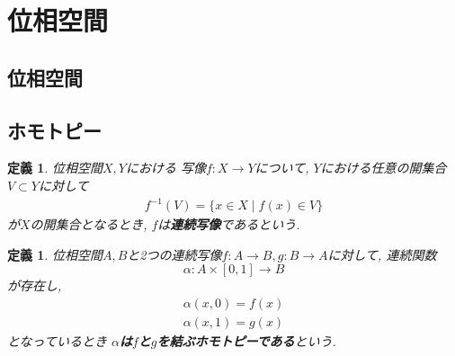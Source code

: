 \documentclass[dvipdfmx]{jsbook}
\theoremstyle{plain}
\newtheorem{Def}[thm]{定義}
\begin{document}
\section{位相空間}
\subsection{位相空間}
\begin{comment}
************************************

\begin{Def}
{\bf $X$上の集合族}という.
\end{Def}
\begin{Def}
集合$X$に関して, $X$の冪集合$\mathscr{P}(X)$の部分集合のことを{\bf $X$上の部分集合族}という.
\end{Def}

\begin{Def}
集合$X$の部分集合族$\mathcal{O}$について, 次が成り立つとき$\mathcal{O}$を{\bf 集合$X$の位相}という.
\begin{enumerate}
\item $X\in\mathcal{O}$,$\emptyset\in\mathcal{O}$
\item 任意の$U,V\in\mathcal{O}$について$U\cap V\in\mathcal{O}$である.
\item ...
\end{enumerate}
\end{Def}

\begin{Def}
集合$X$とその位相$\mathcal{O}$の組$(X,\mathcal{O})$を
{\bf $X$を台集合とし, $\mathcal{O}$を位相とする位相空間}という.
\end{Def}
************************************
\end{comment}
\subsection{ホモトピー}
\begin{Def}
位相空間$X,Y$における
写像$f:X\rightarrow Y$について,
$Y$における任意の開集合$V\subset Y$に対して
\begin{align*}
f^{-1}(V)=\{x\in X\mid f(x)\in V\}
\end{align*}
が$X$の開集合となるとき,
$f$は{\bf 連続写像}であるという.
\end{Def}
\begin{Def}
位相空間$A,B$と2つの連続写像$f:A\rightarrow B,g:B\rightarrow A$に対して, 連続関数
\[
\alpha : A\times [0,1]\rightarrow B
\]
が存在し,
\begin{align*}
\alpha(x,0)=f(x)\\
\alpha(x,1)=g(x)
\end{align*}
となっているとき
{\bf $\alpha$は$f$と$g$を結ぶホモトピーである}という.
\end{Def}
\end{document}
